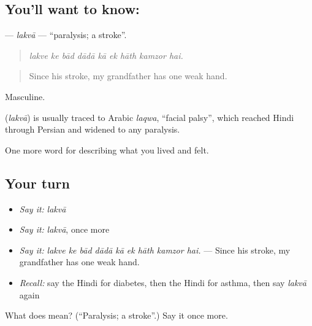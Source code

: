 \subsection*{You'll want to know: }
\textbf{} — \emph{lakvā} — \textquotedblleft{}paralysis; a stroke\textquotedblright{}.

\begin{quote}
        
\end{quote}

\begin{quote}
\emph{lakve ke bād dādā kā ek hāth kamzor hai.}
\end{quote}

\begin{quote}
Since his stroke, my grandfather has one weak hand.
\end{quote}

Masculine.

\begin{cousinweb}
\textbf{} (\emph{lakvā}) is usually traced to Arabic \emph{laqwa}, \textquotedblleft{}facial palsy\textquotedblright{}, which reached Hindi through Persian and widened to any paralysis.
\end{cousinweb}

\begin{grammarlens}[title={What you've built}]
One more word for describing what you lived and felt.
\end{grammarlens}

\subsection*{Your turn}
\begin{itemize}
\raggedright
  \item \emph{Say it:} \emph{lakvā}
  \item \emph{Say it:} \emph{lakvā}, once more
  \item \emph{Say it:} \emph{lakve ke bād dādā kā ek hāth kamzor hai.} — Since his stroke, my grandfather has one weak hand.
  \item \emph{Recall:} say the Hindi for diabetes, then the Hindi for asthma, then say \emph{lakvā} again
\end{itemize}

\begin{tcolorbox}[breakable,colback=teal!4,colframe=teal!35!black,title={Before you move on}]
What does  mean? (\textquotedblleft{}Paralysis; a stroke\textquotedblright{}.) Say it once more.
\end{tcolorbox}
